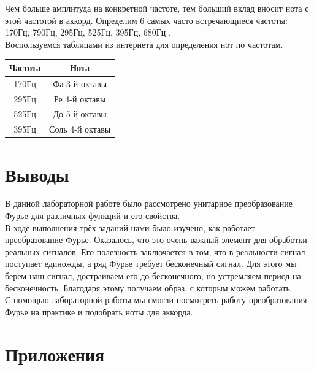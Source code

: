 \documentclass[a4paper,12pt]{article}
\begin{document}
Чем больше амплитуда на конкретной частоте, тем больший вклад вносит нота с этой частотой в аккорд. Определим 6 самых часто встречающиеся частоты: 170Гц, 790Гц, 295Гц, 525Гц, 395Гц, 680Гц .\\
Воспользуемся таблицами из интернета для определения нот по частотам.\\
\begin{center}
\begin{tabular}{|c|c|}
    \hline
    Частота & Нота \\
    \hline
    170Гц & Фа 3-й октавы \\
    \hline
    295Гц & Ре 4-й октавы \\
    \hline
    525Гц & До 5-й октавы \\
    \hline
    395Гц & Соль 4-й октавы \\
    \hline
\end{tabular}
\end{center}

\section{Выводы}
В данной лабораторной работе было рассмотрено унитарное преобразование Фурье для различных функций и его свойства.\\
В ходе выполнения трёх заданий нами было изучено, как работает преобразование Фурье. Оказалось, что это очень важный элемент для обработки реальных сигналов. 
Его полезность заключается в том, что в реальности сигнал поступает единожды, а ряд Фурье требует бесконечный сигнал. Для этого мы берем наш сигнал, достраиваем его до бесконечного, но устремляем период на бесконечность.
Благодаря этому получаем образ, с которым можем работать.\\
С помощью лабораторной работы мы смогли посмотреть работу преобразования Фурье на практике и подобрать ноты для аккорда. 

\newpage
\section{Приложения}
\end{document}
